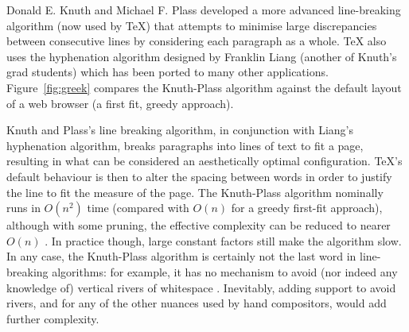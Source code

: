 Donald E. Knuth and Michael F. Plass\hspace{0pt}\cite{Knuth1981} developed a more advanced line-breaking algorithm (now used by \TeX{}) that attempts to minimise large discrepancies between consecutive lines by considering each paragraph as a whole. \TeX{} also uses the hyphenation algorithm designed by Franklin Liang\hspace{0pt}\cite{Liang1983} (another of Knuth's grad students) which has been ported to many other applications. Figure~\ref{fig:greek} compares the Knuth-Plass algorithm against the default layout of a web browser (a first fit, greedy approach).

Knuth and Plass's line breaking algorithm, in conjunction with Liang's hyphenation algorithm, breaks paragraphs into lines of text to fit a page, resulting in what can be considered an aesthetically optimal configuration. \TeX 's default behaviour is then to alter the spacing between words in order to justify the line to fit the \gls{measure} of the page. The Knuth-Plass algorithm nominally runs in $O(n^2)$ time (compared with $O(n)$ for a greedy first-fit approach), although with some pruning, the effective complexity can be reduced to nearer $O(n)$ \cite{Hirschberg1987,Eppstein1992,Hurst2009}. In practice though, large constant factors still make the algorithm slow. In any case, the Knuth-Plass algorithm is certainly not the last word in line-breaking algorithms: for example, it has no mechanism to avoid (nor indeed any knowledge of) vertical rivers of whitespace \cite{Mittelbach1992}. Inevitably, adding support to avoid rivers, and for any of the other nuances used by hand compositors, would add further complexity.

